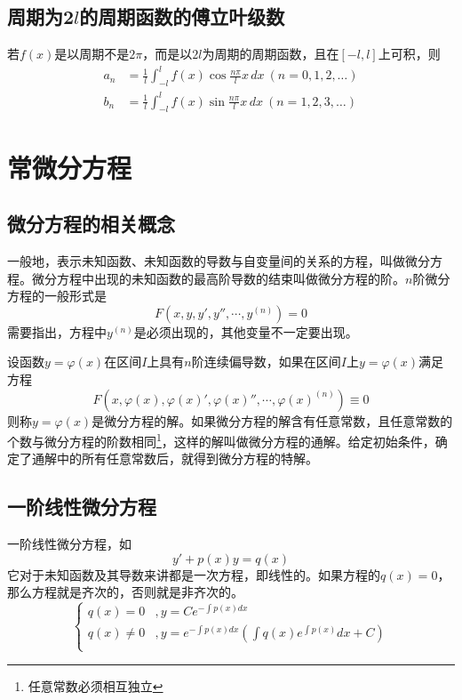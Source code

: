 \subsection[周期函数的傅立叶级数]{周期为2$l$的周期函数的傅立叶级数}
若$f(x)$是以周期不是$2\pi$，而是以$2l$为周期的周期函数，且在$[-l,l]$上可积，则
\begin{align*}
    a_n&=\frac 1l \int_{-l}^l f(x)\cos \frac{n\pi}{l}x\, dx\ (n=0,1,2,\ldots)\\
    b_n&=\frac 1l \int_{-l}^l f(x)\sin \frac{n\pi}{l}x\, dx\ (n=1,2,3,\ldots)
\end{align*}
\section{常微分方程}
\subsection{微分方程的相关概念}
一般地，表示未知函数、未知函数的导数与自变量间的关系的方程，叫做微分方程。微分方程中出现的未知函数的最高阶导数的结束叫做微分方程的阶。$n$阶微分方程的一般形式是
\[F\left(x,y,y',y'',\cdots,y^{(n)}\right)=0\]
需要指出，方程中$y^{(n)}$是必须出现的，其他变量不一定要出现。

设函数$y=\varphi(x)$在区间$I$上具有$n$阶连续偏导数，如果在区间$I$上$y=
\varphi(x)$满足方程
\[F\left(x,\varphi(x),\varphi(x)',\varphi(x)'',\cdots,\varphi(x)^{(n)}\right)\equiv0\]
则称$y=\varphi(x)$是微分方程的解。如果微分方程的解含有任意常数，且任意常数的个数与微分方程的阶数相同\footnote{任意常数必须相互独立}，这样的解叫做微分方程的通解。给定初始条件，确定了通解中的所有任意常数后，就得到微分方程的特解。
\subsection{一阶线性微分方程}
一阶线性微分方程，如
\[y'+p(x)y=q(x)\]
它对于未知函数及其导数来讲都是一次方程，即线性的。如果方程的$q(x)=0$，那么方程就是齐次的，否则就是非齐次的。
\[\begin{cases}
q(x)=0&,y=Ce^{-\int p(x)dx}\\
q(x)\ne0&,y=e^{-\int p(x)dx}\left(\int q(x)e^{\int p(x)}dx+C\right)\\
\end{cases}\]
